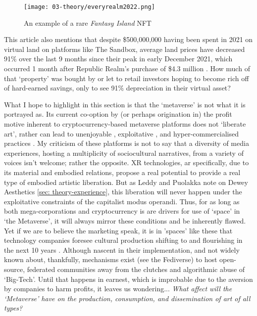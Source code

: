 \begin{wrapfigure}{L}{0.45\textwidth}
    \vspace{-\intextsep}
    \begin{minipage}{0.95\linewidth}
        \texttt{[image: 03-theory/everyrealm2022.png]}
        \captionsetup{justification=justified}
        \caption{An example of a rare \textit{Fantasy Island} NFT \citep[from][]{everyrealm2022}}\label{fig: everyrealm2022}
    \end{minipage}
    \hfill
\end{wrapfigure}

This article also mentions that despite \$500,000,000 having been spent in 2021 on virtual land on platforms like The Sandbox, average land prices have decreased 91\% over the last 9 months since their peak in early December 2021, which occurred 1 month after Republic Realm's purchase of \$4.3 million \citep[]{kane2022}. How much of that `property' was bought by or let to retail investors hoping to become rich off of hard-earned savings, only to see 91\% depreciation in their virtual asset? 

What I hope to highlight in this section is that the `metaverse' is not what it is portrayed as. Its current co-option by (or perhaps origination in) the profit motive inherent to cryptocurrency-based metaverse platforms does not `liberate art', rather can lead to unenjoyable \citep{dejesus2022,delic2022}, exploitative , and hyper-commercialised practices \citep[]{ledesma2021,ongwesojr.2022,gach2022}. My criticism of these platforms is not to say that a diversity of media experiences, hosting a multiplicity of sociocultural narratives, from a variety of voices isn't welcome; rather the opposite. XR technologies, \gls{ar} specifically, due to its material and embodied relations, propose a real potential to provide a real type of embodied artistic liberation. But as Leddy and Puolakka note on Dewey Aesthetics \autoref{sec: theory-experience}, this liberation will never happen under the exploitative constraints of the capitalist modus operandi. Thus, for as long as both mega-corporations and cryptocurrency is are drivers for use of `space' in `the Metaverse', it will always mirror these conditions and be inherently flawed. Yet if we are to believe the marketing speak, it is in 'spaces' like these that technology companies foresee cultural production shifting to and flourishing in the next 10 years \citep[]{fatemi2022}. Although nascent in their implementation, and not widely known about, thankfully, mechanisms exist (see the Fediverse) to host open-source, federated communities away from the clutches and algorithmic abuse of `Big-Tech'. Until that happens in earnest, which is improbable due to the aversion by companies to harm profits, it leaves us wondering... \textit{What affect will the `Metaverse' have on the production, consumption, and dissemination of art of all types?}

